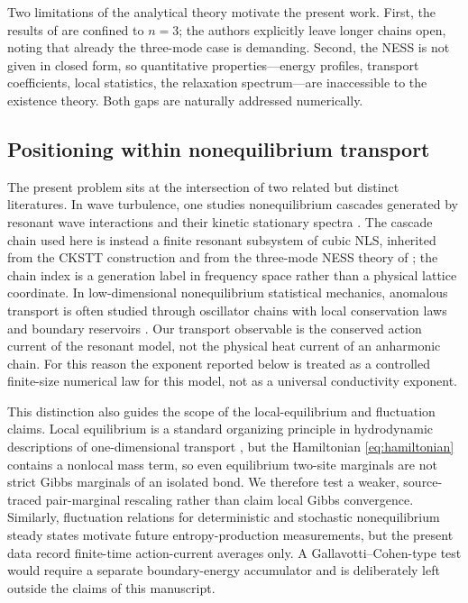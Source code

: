 \documentclass[11pt,a4paper]{article}
\theoremstyle{definition}
\numberwithin{equation}{section}   %
\begin{document}
Two limitations of the analytical theory motivate the present work. First, the
results of \cite{HLNS} are confined to $n=3$; the authors explicitly leave longer
chains open, noting that already the three-mode case is demanding. Second, the
NESS is not given in closed form, so quantitative properties---energy profiles,
transport coefficients, local statistics, the relaxation spectrum---are
inaccessible to the existence theory. Both gaps are naturally addressed
numerically.

\subsection{Positioning within nonequilibrium transport}
\label{sec:positioning}

The present problem sits at the intersection of two related but distinct
literatures. In wave turbulence, one studies nonequilibrium cascades generated
by resonant wave interactions and their kinetic stationary spectra
\cite{Nazarenko}. The cascade chain used here is instead a finite resonant
subsystem of cubic NLS, inherited from the CKSTT construction \cite{CKSTT} and
from the three-mode NESS theory of \cite{HLNS}; the chain index is a generation
label in frequency space rather than a physical lattice coordinate. In
low-dimensional nonequilibrium statistical mechanics, anomalous transport is
often studied through oscillator chains with local conservation laws and
boundary reservoirs \cite{LepriLiviPoliti,Dhar2008,Spohn2014}. Our transport
observable is the conserved action current of the resonant model, not the
physical heat current of an anharmonic chain. For this reason the exponent
reported below is treated as a controlled finite-size numerical law for this
model, not as a universal conductivity exponent.

This distinction also guides the scope of the local-equilibrium and fluctuation
claims. Local equilibrium is a standard organizing principle in hydrodynamic
descriptions of one-dimensional transport \cite{Spohn2014}, but the Hamiltonian
\eqref{eq:hamiltonian} contains a nonlocal mass term, so even equilibrium
two-site marginals are not strict Gibbs marginals of an isolated bond. We
therefore test a weaker, source-traced pair-marginal rescaling rather than claim
local Gibbs convergence. Similarly, fluctuation relations for deterministic and
stochastic nonequilibrium steady states
\cite{GallavottiCohen,LebowitzSpohn1999} motivate future entropy-production
measurements, but the present data record finite-time action-current averages
only. A Gallavotti--Cohen-type test would require a separate boundary-energy
accumulator and is deliberately left outside the claims of this manuscript.
\end{document}
